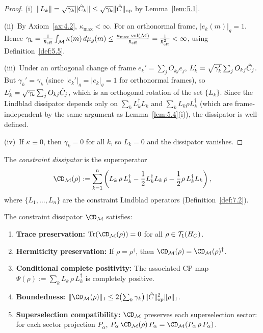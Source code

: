 \begin{proof}
(i)~$\|L_k\| = \sqrt{\gamma_k}\|\hat{C}_k\| \leq
\sqrt{\gamma_k}\|\hat{C}\|_{\mathrm{op}}$ by Lemma~\ref{lem:5.1}.

(ii)~By Axiom~\ref{ax:4.2}, $\kappa_{\max} < \infty$.  For an
orthonormal frame, $|e_k(m)|_g = 1$.  Hence
$\gamma_k = \frac{1}{\hbar_{\mathrm{eff}}}
\int_{\mathcal{M}} \kappa(m)\,d\mu_g(m) \leq
\frac{\kappa_{\max} \cdot \mathrm{vol}(\mathcal{M})}{\hbar_{\mathrm{eff}}}
= \frac{1}{\hbar_{\mathrm{eff}}^2} < \infty$,
using Definition~\ref{def:5.5}.

(iii)~Under an orthogonal change of frame $e_k' = \sum_j O_{kj} e_j$,
$L_k' = \sqrt{\gamma_k'}\sum_j O_{kj}\hat{C}_j$.  But $\gamma_k' =
\gamma_k$ (since $|e_k'|_g = |e_k|_g = 1$ for orthonormal frames),
so $L_k' = \sqrt{\gamma_k}\sum_j O_{kj}\hat{C}_j$, which is an orthogonal
rotation of the set $\{L_k\}$.  Since the Lindblad dissipator depends
only on $\sum_k L_k^\dagger L_k$ and $\sum_k L_k \rho L_k^\dagger$
(which are frame-independent by the same argument as
Lemma~\ref{lem:5.4}(i)), the dissipator is well-defined.

(iv)~If $\kappa \equiv 0$, then $\gamma_k = 0$ for all $k$, so
$L_k = 0$ and the dissipator vanishes.
\end{proof}

\begin{definition}
\label{def:7.3}
The \emph{constraint dissipator} is the superoperator
\[
  \CD_\CM(\rho) :=
  \sum_{k=1}^{n} \left(
    L_k\,\rho\,L_k^\dagger
    - \frac{1}{2} L_k^\dagger L_k\,\rho
    - \frac{1}{2} \rho\,L_k^\dagger L_k
  \right),
\]
where $\{L_1, \ldots, L_n\}$ are the constraint Lindblad operators
\textup{(}Definition~\textup{\ref{def:7.2})}.
\end{definition}

\begin{lemma}
\label{lem:7.3}
The constraint dissipator $\CD_\CM$ satisfies:
\begin{enumerate}
  \item[\textup{(i)}] \textbf{Trace preservation:}
    $\Tr(\CD_\CM(\rho)) = 0$ for all $\rho \in \mathcal{T}_1(H_C)$.
  \item[\textup{(ii)}] \textbf{Hermiticity preservation:}
    If $\rho = \rho^\dagger$, then
    $\CD_\CM(\rho) = \CD_\CM(\rho)^\dagger$.
  \item[\textup{(iii)}] \textbf{Conditional complete positivity:}
    The associated CP map
    $\Psi(\rho) := \sum_k L_k\,\rho\,L_k^\dagger$ is completely
    positive.
  \item[\textup{(iv)}] \textbf{Boundedness:}
    $\|\CD_\CM(\rho)\|_1 \leq
    2\bigl(\sum_k \gamma_k\bigr) \|\hatC\|_{\mathrm{op}}^2
    \|\rho\|_1$.
  \item[\textup{(v)}] \textbf{Superselection compatibility:}
    $\CD_\CM$ preserves each superselection sector: for each sector
    projection $P_\alpha$,
    $P_\alpha\,\CD_\CM(\rho)\,P_\alpha =
    \CD_\CM(P_\alpha\,\rho\,P_\alpha)$.
\end{enumerate}
\end{lemma}

